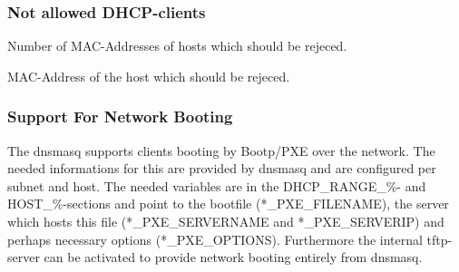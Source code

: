 \subsubsection{Not allowed DHCP-clients}
\begin{description}

    {Number of MAC-Addresses of hosts which should be rejeced.}


    {MAC-Address of the host which should be rejeced.}

  \end{description}

  \subsubsection{Support For Network Booting}

  The dnsmasq supports clients booting by Bootp/PXE over
  the network. The needed informations for this are provided
  by dnsmasq and are configured per subnet and host. The needed variables
  are in the DHCP\_RANGE\_\%- and HOST\_\%-sections and
  point to the bootfile (*\_PXE\_FILENAME), the server which hosts this
  file (*\_PXE\_SERVERNAME and *\_PXE\_SERVERIP) and perhaps necessary
  options (*\_PXE\_OPTIONS). Furthermore the internal tftp-server can be
  activated to provide network booting entirely from dnsmasq.

